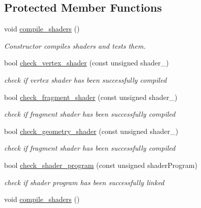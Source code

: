 \subsection*{Protected Member Functions}
\begin{DoxyCompactItemize}
\item 
void \mbox{\hyperlink{classShader_3_01RENDER__TYPE_1_1CUSTOM_01_4_aede40b234ac1e38be9d0f9f2a60a26ab}{compile\+\_\+shaders}} ()
\begin{DoxyCompactList}\small\item\em Constructor compiles shaders and tests them. \end{DoxyCompactList}\item 
bool \mbox{\hyperlink{classShader_3_01RENDER__TYPE_1_1CUSTOM_01_4_afca4ecec5bed3cf6a9f219ce52e5343e}{check\+\_\+vertex\+\_\+shader}} (const unsigned shader\+\_\+)
\begin{DoxyCompactList}\small\item\em check if vertex shader has been successfully compiled \end{DoxyCompactList}\item 
bool \mbox{\hyperlink{classShader_3_01RENDER__TYPE_1_1CUSTOM_01_4_a8ba4a9ccbbf73e471434981a62b15d41}{check\+\_\+fragment\+\_\+shader}} (const unsigned shader\+\_\+)
\begin{DoxyCompactList}\small\item\em check if fragment shader has been successfully compiled \end{DoxyCompactList}\item 
bool \mbox{\hyperlink{classShader_3_01RENDER__TYPE_1_1CUSTOM_01_4_aca3ba4448a05303b92667e88e18f5cfb}{check\+\_\+geometry\+\_\+shader}} (const unsigned shader\+\_\+)
\begin{DoxyCompactList}\small\item\em check if fragment shader has been successfully compiled \end{DoxyCompactList}\item 
bool \mbox{\hyperlink{classShader_3_01RENDER__TYPE_1_1CUSTOM_01_4_af59ced307a40764c2fa1acef66e074b3}{check\+\_\+shader\+\_\+program}} (const unsigned shader\+Program)
\begin{DoxyCompactList}\small\item\em check if shader program has been successfully linked \end{DoxyCompactList}\item 
void \mbox{\hyperlink{classShader_3_01RENDER__TYPE_1_1CUSTOM_01_4_aede40b234ac1e38be9d0f9f2a60a26ab}{compile\+\_\+shaders}} ()

\end{DoxyCompactItemize}
